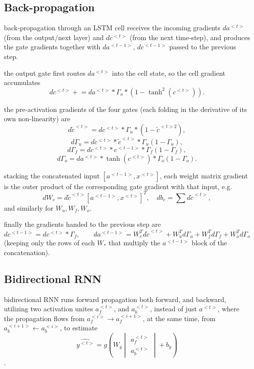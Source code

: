 \documentclass[4apaper,12pt]{book}
\begin{document}
\begin{description}
\begin{description}
      \subsection{Back-propagation}
      \begin{description}
      \item back-propagation through an LSTM cell receives the incoming gradients $da^{<t>}$ (from the output/next layer) and $dc^{<t>}$ (from the next time-step), and produces the gate gradients together with $da^{<t-1>}$, $dc^{<t-1>}$ passed to the previous step.
      \item the output gate first routes $da^{<t>}$ into the cell state, so the cell gradient accumulates $$dc^{<t>} \mathrel{+}= da^{<t>} * \Gamma_o * (1-\tanh^2(c^{<t>})).$$
      \item the pre-activation gradients of the four gates (each folding in the derivative of its own non-linearity) are $$d\tilde{c}^{<t>}=dc^{<t>}*\Gamma_u*(1-\tilde{c}^{<t>2}),$$ $$d\Gamma_u=dc^{<t>}*\tilde{c}^{<t>}*\Gamma_u(1-\Gamma_u),$$ $$d\Gamma_f=dc^{<t>}*c^{<t-1>}*\Gamma_f(1-\Gamma_f),$$ $$d\Gamma_o=da^{<t>}*\tanh(c^{<t>})*\Gamma_o(1-\Gamma_o).$$
      \item stacking the concatenated input $[a^{<t-1>},x^{<t>}]$, each weight matrix gradient is the outer product of the corresponding gate gradient with that input, e.g. $$dW_c=d\tilde{c}^{<t>}[a^{<t-1>},x^{<t>}]^T,\quad db_c=\textstyle\sum d\tilde{c}^{<t>},$$ and similarly for $W_u,W_f,W_o$.
      \item finally the gradients handed to the previous step are $$dc^{<t-1>}=dc^{<t>}*\Gamma_f,\qquad da^{<t-1>}=W_c^T d\tilde{c}^{<t>}+W_u^T d\Gamma_u+W_f^T d\Gamma_f+W_o^T d\Gamma_o$$ (keeping only the rows of each $W_*$ that multiply the $a^{<t-1>}$ block of the concatenation).
      \end{description}
    \end{description}
    \subsection{Bidirectional RNN}
    \begin{description}
      \item bidirectional RNN runs forward propagation both forward, and backward, utilizing two activation unites $a_f^{<t>}$, and $a_b^{<t>}$, instead of just $a^{<t>}$, where the propagation flows from $a_f^{<i>} \rightarrow a_f^{<i+1>}$, at the same time, from $a_b^{<i+1>} \leftarrow a_b^{<i>}$, to estimate $$\hat{y^{<t>}} = g(W_y\begin{vmatrix}a_f^{<t>}\\a_b^{<t>}\end{vmatrix} + b_y)$$.
      \item {}
\end{description}
\end{description}
\end{document}
